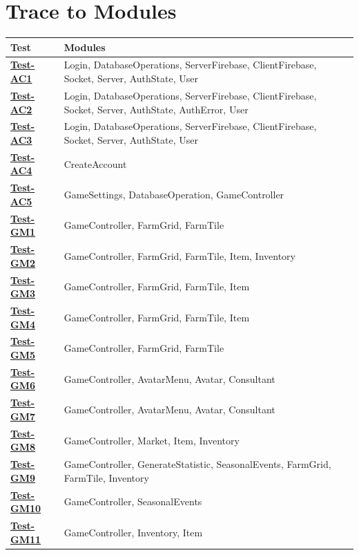 \documentclass[12pt, titlepage]{article}
\begin{document}
\section{Trace to Modules}	
\begin{table}[H]
\centering
\begin{tabular}{p{} p{}}
\toprule
\textbf{Test} & \textbf{Modules}\\
\midrule
\hyperref[Test-AC1]{\textbf{Test-AC1}} & Login, DatabaseOperations, ServerFirebase, ClientFirebase, Socket, Server, AuthState, User\\
\hyperref[Test-AC2]{\textbf{Test-AC2}} & Login, DatabaseOperations, ServerFirebase, ClientFirebase, Socket, Server, AuthState, AuthError, User\\
\hyperref[Test-AC3]{\textbf{Test-AC3}} & Login, DatabaseOperations, ServerFirebase, ClientFirebase, Socket, Server, AuthState, User\\
\hyperref[Test-AC4]{\textbf{Test-AC4}} & CreateAccount\\
\hyperref[Test-AC5]{\textbf{Test-AC5}} & GameSettings, DatabaseOperation, GameController\\
\hyperref[Test-GM1]{\textbf{Test-GM1}} & GameController, FarmGrid, FarmTile\\
\hyperref[Test-GM2]{\textbf{Test-GM2}} & GameController, FarmGrid, FarmTile, Item, Inventory\\
\hyperref[Test-GM3]{\textbf{Test-GM3}} & GameController, FarmGrid, FarmTile, Item\\
\hyperref[Test-GM4]{\textbf{Test-GM4}} & GameController, FarmGrid, FarmTile, Item\\
\hyperref[Test-GM5]{\textbf{Test-GM5}} & GameController, FarmGrid, FarmTile\\
\hyperref[Test-GM6]{\textbf{Test-GM6}} & GameController, AvatarMenu, Avatar, Consultant\\
\hyperref[Test-GM7]{\textbf{Test-GM7}} & GameController, AvatarMenu, Avatar, Consultant\\
\hyperref[Test-GM8]{\textbf{Test-GM8}} & GameController, Market, Item, Inventory\\
\hyperref[Test-GM9]{\textbf{Test-GM9}} & GameController, GenerateStatistic, SeasonalEvents, FarmGrid, FarmTile, Inventory\\
\hyperref[Test-GM10]{\textbf{Test-GM10}} & GameController, SeasonalEvents\\
\hyperref[Test-GM11]{\textbf{Test-GM11}} & GameController, Inventory, Item\\

\end{tabular}
\end{table}
\end{document}
